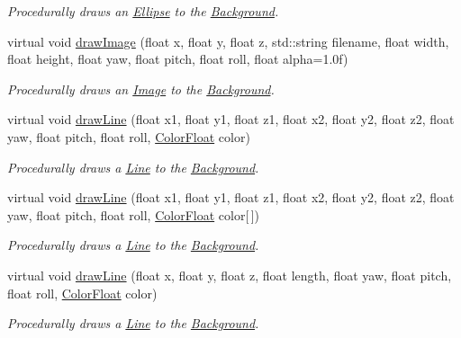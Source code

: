 \begin{DoxyCompactItemize}
\begin{DoxyCompactList}\small\item\em Procedurally draws an \hyperlink{classtsgl_1_1_ellipse}{Ellipse} to the \hyperlink{classtsgl_1_1_background}{Background}. \end{DoxyCompactList}\item 
virtual void \hyperlink{classtsgl_1_1_background_acb5d1bea937b29967a3b74b2f9787157}{draw\+Image} (float x, float y, float z, std\+::string filename, float width, float height, float yaw, float pitch, float roll, float alpha=1.\+0f)
\begin{DoxyCompactList}\small\item\em Procedurally draws an \hyperlink{classtsgl_1_1_image}{Image} to the \hyperlink{classtsgl_1_1_background}{Background}. \end{DoxyCompactList}\item 
virtual void \hyperlink{classtsgl_1_1_background_a66c00fa5df216c488437ff5dc21e7143}{draw\+Line} (float x1, float y1, float z1, float x2, float y2, float z2, float yaw, float pitch, float roll, \hyperlink{structtsgl_1_1_color_float}{Color\+Float} color)
\begin{DoxyCompactList}\small\item\em Procedurally draws a \hyperlink{classtsgl_1_1_line}{Line} to the \hyperlink{classtsgl_1_1_background}{Background}. \end{DoxyCompactList}\item 
virtual void \hyperlink{classtsgl_1_1_background_a861124dc8a8446257ca7c0e521bf51eb}{draw\+Line} (float x1, float y1, float z1, float x2, float y2, float z2, float yaw, float pitch, float roll, \hyperlink{structtsgl_1_1_color_float}{Color\+Float} color\mbox{[}$\,$\mbox{]})
\begin{DoxyCompactList}\small\item\em Procedurally draws a \hyperlink{classtsgl_1_1_line}{Line} to the \hyperlink{classtsgl_1_1_background}{Background}. \end{DoxyCompactList}\item 
virtual void \hyperlink{classtsgl_1_1_background_a124bab5be013f6d00b08c5f33e1fc41e}{draw\+Line} (float x, float y, float z, float length, float yaw, float pitch, float roll, \hyperlink{structtsgl_1_1_color_float}{Color\+Float} color)
\begin{DoxyCompactList}\small\item\em Procedurally draws a \hyperlink{classtsgl_1_1_line}{Line} to the \hyperlink{classtsgl_1_1_background}{Background}. \end{DoxyCompactList}\item 

\end{DoxyCompactItemize}
